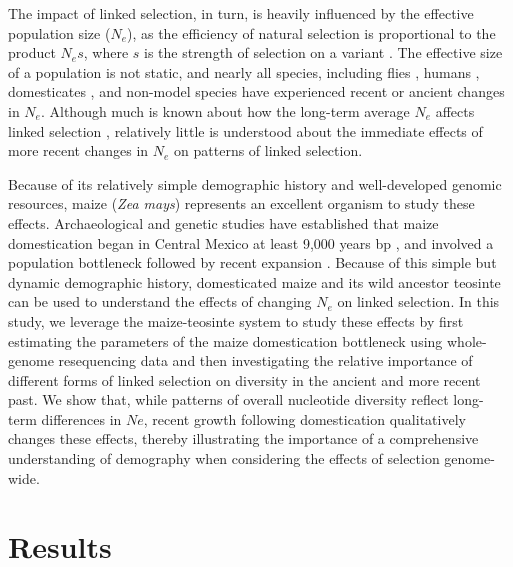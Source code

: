 \documentclass{pnastwo}
\begin{document}
\begin{article}
The impact of linked selection, in turn, is heavily influenced by the effective population size ($N_e$), as the  efficiency of natural selection is proportional to the product $N_es$, where $s$ is the strength of selection on a variant \cite{cutter2013, slotte2014, corbett2015,leffler2012}.
The effective size of a population is not static, and nearly all species, including flies \cite{duchen2013}, humans \cite{reich1998}, domesticates \cite{hyten2006, bovine2009}, and non-model species \cite{ellegren2014} have experienced recent or ancient changes in $N_e$. 
Although much is known about how the long-term average $N_e$ affects linked selection \cite{cutter2013}, relatively little is understood about the immediate effects of more recent changes in $N_e$ on patterns of linked selection.

Because of its relatively simple demographic history and well-developed genomic resources, maize (\emph{Zea mays}) represents an excellent organism to study these effects. 
Archaeological and genetic studies have established that maize domestication began in Central Mexico at least 9,000 years bp \cite{smith1995,matsuoka2002}, and involved a population bottleneck followed by recent expansion \cite{wright2005,eyre1998,tenaillon2004}.
Because of this simple but dynamic demographic history, domesticated maize and its wild ancestor teosinte can be used to understand the effects of changing $N_e$ on linked selection. 
In this study, we leverage the maize-teosinte system to study these effects by first estimating the parameters of the maize domestication bottleneck using whole-genome resequencing data and then investigating the relative importance of different forms of linked selection on diversity in the ancient and more recent past. 
We show that, while patterns of overall nucleotide diversity reflect long-term differences in $Ne$, recent growth following domestication qualitatively changes these effects, thereby illustrating the importance of a comprehensive understanding of demography when considering the effects of selection genome-wide. 

\section{Results}


\end{article}
\end{document}
